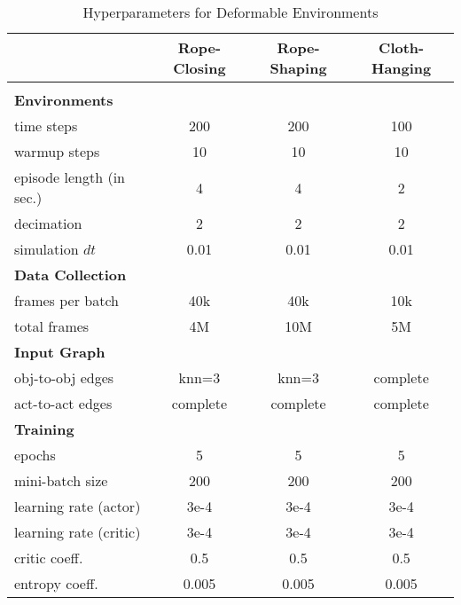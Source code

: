 \begin{table}[htb]
\centering
\caption{Hyperparameters for Deformable Environments}
\label{tab:deformable-HP}
\begin{adjustbox}{max width=\textwidth}
\begin{tabular}{lccc}
\toprule
   & \textbf{Rope-Closing} & \textbf{Rope-Shaping} & \textbf{Cloth-Hanging} \\ 
\midrule
\multicolumn{4}{l}{} \\
\textbf{Environments}  &             &             &             \\  
time steps             & 200          & 200          & 100          \\ 
warmup steps           & 10           & 10           & 10           \\
episode length (in sec.) & 4           & 4           & 2            \\
decimation             & 2           & 2           & 2               \\
simulation $dt$        & 0.01        & 0.01        & 0.01               \\ 
\midrule
\textbf{Data Collection}  &             &             &             \\
frames per batch       & 40k          & 40k          & 10k          \\ 
total frames           & 4M           & 10M          & 5M           \\
\midrule
\textbf{Input Graph}   &             &             &             \\
obj-to-obj edges       & knn=3        & knn=3       & complete \\
act-to-act edges       & complete     & complete    & complete  \\
\midrule
\textbf{Training}      &             &             &             \\
epochs                 & 5           & 5           & 5            \\ 
mini-batch size        & 200          & 200          & 200            \\ 
learning rate (actor)  & 3e-4        & 3e-4        & 3e-4             \\
learning rate (critic) & 3e-4        & 3e-4        & 3e-4             \\ 
critic coeff.          & 0.5         & 0.5         & 0.5             \\ 
entropy coeff.         & 0.005       & 0.005       & 0.005             \\ 

\end{tabular}
\end{adjustbox}
\end{table}
